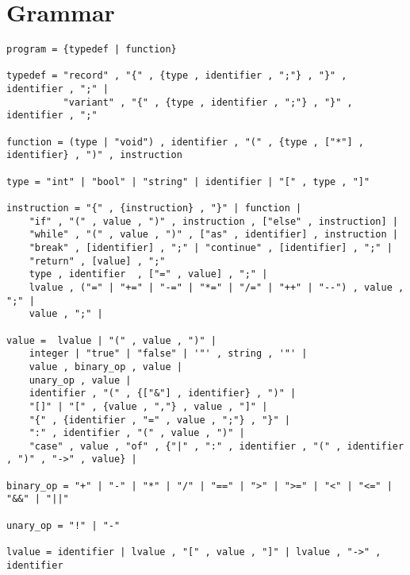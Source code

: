 \documentclass[a4paper,8pt]{extarticle}
\begin{document}
\section{Grammar}
\begin{verbatim}
program = {typedef | function}

typedef = "record" , "{" , {type , identifier , ";"} , "}" , identifier , ";" |
          "variant" , "{" , {type , identifier , ";"} , "}" , identifier , ";"

function = (type | "void") , identifier , "(" , {type , ["*"] , identifier} , ")" , instruction
	
type = "int" | "bool" | "string" | identifier | "[" , type , "]"

instruction = "{" , {instruction} , "}" | function |
    "if" , "(" , value , ")" , instruction , ["else" , instruction] |
    "while" , "(" , value , ")" , ["as" , identifier] , instruction |
    "break" , [identifier] , ";" | "continue" , [identifier] , ";" |
    "return" , [value] , ";"
    type , identifier  , ["=" , value] , ";" |
    lvalue , ("=" | "+=" | "-=" | "*=" | "/=" | "++" | "--") , value , ";" |
    value , ";" |

value =  lvalue | "(" , value , ")" |
    integer | "true" | "false" | '"' , string , '"' |
    value , binary_op , value |
    unary_op , value |
    identifier , "(" , {["&"] , identifier} , ")" |
    "[]" | "[" , {value , ","} , value , "]" |
    "{" , {identifier , "=" , value , ";"} , "}" |
    ":" , identifier , "(" , value , ")" |
    "case" , value , "of" , {"|" , ":" , identifier , "(" , identifier , ")" , "->" , value} |

binary_op = "+" | "-" | "*" | "/" | "==" | ">" | ">=" | "<" | "<=" | "&&" | "||"

unary_op = "!" | "-"

lvalue = identifier | lvalue , "[" , value , "]" | lvalue , "->" , identifier
\end{verbatim}
\end{document}

